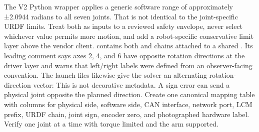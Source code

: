 {}\markdownRendererInterblockSeparator
{}The V2 Python wrapper applies a generic software range of approximately ±2.0944 radians to all seven joints. That is not identical to the joint-specific URDF limits. Treat both as inputs to a reviewed safety envelope, never select whichever value permits more motion, and add a robot-specific conservative limit layer above the vendor client.\markdownRendererInterblockSeparator
{}
\markdownRendererSectionEnd \markdownRendererSectionBegin
{}\markdownRendererInterblockSeparator
{} contains both  and  chains attached to a shared . Its leading comment says axes 2, 4, and 6 have opposite rotation directions at the driver layer and warns that left/right labels were defined from an observer-facing convention. The launch files likewise give the solver an alternating rotation-direction vector:\markdownRendererInterblockSeparator
{}\markdownRendererInterblockSeparator
{}This is not decorative metadata. A sign error can send a physical joint opposite the planned direction. Create one canonical mapping table with columns for physical side, software side, CAN interface, network port, LCM prefix, URDF chain, joint sign, encoder zero, and photographed hardware label. Verify one joint at a time with torque limited and the arm supported.\markdownRendererParagraphSeparator
